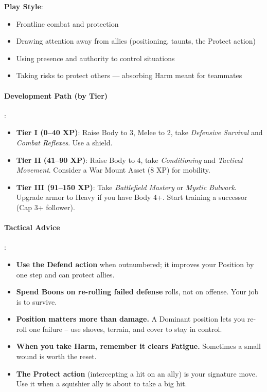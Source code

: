 \textbf{Play Style}:
\begin{itemize}
\item Frontline combat and protection
\item Drawing attention away from allies (positioning, taunts, the Protect action)
\item Using presence and authority to control situations
\item Taking risks to protect others --- absorbing Harm meant for teammates
\end{itemize}

\paragraph{Development Path (by Tier)}:
\begin{itemize}
\item \textbf{Tier I (0--40 XP)}: Raise Body to 3, Melee to 2, take \emph{Defensive Survival} and \emph{Combat Reflexes}. Use a shield.
\item \textbf{Tier II (41--90 XP)}: Raise Body to 4, take \emph{Conditioning} and \emph{Tactical Movement}. Consider a War Mount Asset (8 XP) for mobility.
\item \textbf{Tier III (91--150 XP)}: Take \emph{Battlefield Mastery} or \emph{Mystic Bulwark}. Upgrade armor to Heavy if you have Body 4+. Start training a successor (Cap 3+ follower).
\end{itemize}

\paragraph{Tactical Advice}:
\begin{itemize}
\item \textbf{Use the Defend action} when outnumbered; it improves your Position by one step and can protect allies.
\item \textbf{Spend Boons on re-rolling failed defense} rolls, not on offense. Your job is to survive.
\item \textbf{Position matters more than damage.} A Dominant position lets you re-roll one failure -- use shoves, terrain, and cover to stay in control.
\item \textbf{When you take Harm, remember it clears Fatigue.} Sometimes a small wound is worth the reset.
\item \textbf{The Protect action} (intercepting a hit on an ally) is your signature move. Use it when a squishier ally is about to take a big hit.
\end{itemize}

